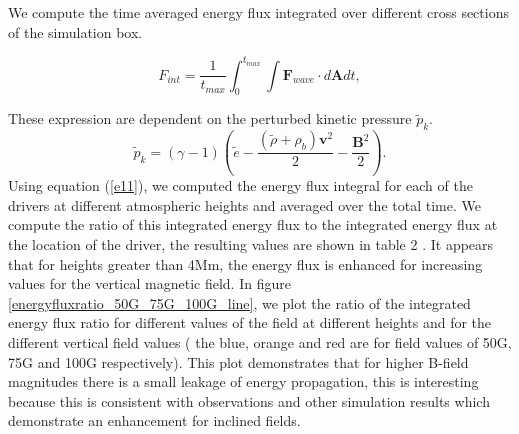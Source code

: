 \documentclass[linenumbers]{aastex63}
\begin{document}
We compute the time averaged energy flux integrated over different cross sections of the simulation box.

\begin{equation}
F_{int}= \frac{1}{t_{max}} \int_{0}^{t_{max}} \int {\mathbf F}_{wave} \cdot d{\mathbf A}dt,
\label{e11}
\end{equation}

These expression are dependent on the perturbed kinetic pressure $\tilde{p}_{k}$.
$$
\tilde{p}_{k}=\left(\gamma - 1\right)\left( \tilde{e}-\frac{ \left( \tilde{\rho} +\rho_b \right){\mathbf v}^2}{2}-\frac{{\mathbf B}^2}{2}\right).
$$
Using equation (\ref{e11}), we computed the energy flux integral for each of the drivers at different atmospheric heights and averaged over the total time. We compute the ratio of this integrated energy flux to the integrated energy flux at the location of the driver, the resulting values are shown in table 2 . It appears that for heights greater than 4Mm, the energy flux is enhanced for increasing values for the vertical magnetic field. In figure \ref{energyfluxratio_50G_75G_100G_line},  we plot the ratio of the integrated energy flux ratio for different values of the field at different heights and for the different vertical field values ( the blue, orange and red  are for field values of 50G, 75G and 100G respectively). This plot demonstrates that for higher B-field magnitudes there is a small leakage of energy propagation, this is interesting because this is consistent with observations and other simulation results which demonstrate an enhancement for inclined fields.



\end{document}
